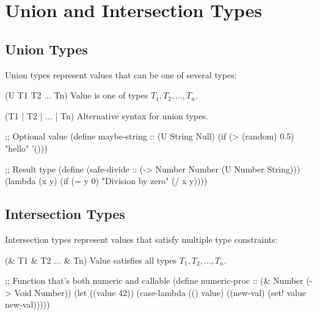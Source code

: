 \section{Union and Intersection Types}
\label{sec:union-intersection}


\subsection{Union Types}
\label{subsec:union-types}

Union types represent values that can be one of several types:

\begin{typespec}{(U T1 T2 ... Tn)}
Value is one of types $T_1, T_2, \ldots, T_n$.
\end{typespec}

\begin{typespec}{(T1 | T2 | ... | Tn)}
Alternative syntax for union types.
\end{typespec}

\begin{example}
\begin{lambdustcode}
;; Optional value  
(define maybe-string :: (U String Null) 
  (if (> (random) 0.5) "hello" '()))

;; Result type
(define (safe-divide :: (-> Number Number (U Number String)))
  (lambda (x y)
    (if (= y 0) 
        "Division by zero"
        (/ x y))))
\end{lambdustcode}
\end{example}

\subsection{Intersection Types}
\label{subsec:intersection-types}

Intersection types represent values that satisfy multiple type constraints:

\begin{typespec}{(\& T1 \& T2 ... \& Tn)}
Value satisfies all types $T_1, T_2, \ldots, T_n$.
\end{typespec}

\begin{example}
\begin{lambdustcode}
;; Function that's both numeric and callable
(define numeric-proc :: (& Number (-> Void Number))
  (let ((value 42))
    (case-lambda 
      (() value)
      ((new-val) (set! value new-val)))))
\end{lambdustcode}
\end{example}

